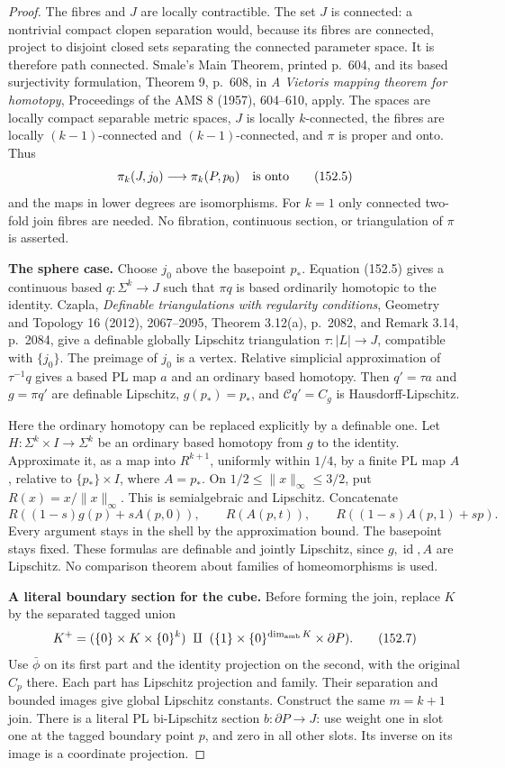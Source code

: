 \begin{proof}
The fibres and \(J\) are locally contractible.
The set \(J\) is connected: a nontrivial compact clopen separation
would, because its fibres are connected, project to disjoint closed
sets separating the connected parameter space. It is therefore path
connected. Smale's Main Theorem, printed p.~604, and its based
surjectivity formulation, Theorem 9, p.~608, in
\emph{A Vietoris mapping theorem for homotopy},
Proceedings of the AMS 8 (1957), 604--610, apply.
The spaces are locally compact separable metric spaces, \(J\) is
locally \(k\)-connected, the fibres are locally
\((k-1)\)-connected and \((k-1)\)-connected, and \(\pi\) is proper
and onto. Thus
\[
 \pi_k(J,j_0)\longrightarrow\pi_k(P,p_0)
 \quad\hbox{is onto}
 \tag{152.5}
\]
and the maps in lower degrees are isomorphisms.
For \(k=1\) only connected two-fold join fibres are needed.
No fibration, continuous section, or triangulation of \(\pi\) is
asserted.

\textbf{The sphere case.}
Choose \(j_0\) above the basepoint \(p_*\).
Equation (152.5) gives a continuous based
\(q:\Sigma^k\to J\) such that \(\pi q\) is based ordinarily
homotopic to the identity.
Czapla, \emph{Definable triangulations with regularity conditions},
Geometry and Topology 16 (2012), 2067--2095,
Theorem 3.12(a), p.~2082, and Remark 3.14, p.~2084, give a definable
globally Lipschitz triangulation \(\tau:|L|\to J\), compatible with
\(\{j_0\}\). The preimage of \(j_0\) is a vertex.
Relative simplicial approximation of \(\tau^{-1}q\) gives a based
PL map \(a\) and an ordinary based homotopy.
Then \(q'=\tau a\) and \(g=\pi q'\) are definable Lipschitz,
\(g(p_*)=p_*\), and \(\mathcal Cq'=C_g\) is Hausdorff-Lipschitz.

Here the ordinary homotopy can be replaced explicitly by a definable
one. Let \(H:\Sigma^k\times I\to\Sigma^k\) be an ordinary based
homotopy from \(g\) to the identity. Approximate it, as a map into
\(R^{k+1}\), uniformly within \(1/4\), by a finite PL map \(A\),
relative to \(\{p_*\}\times I\), where \(A=p_*\).
On \(1/2\le\|x\|_\infty\le3/2\), put \(R(x)=x/\|x\|_\infty\).
This is semialgebraic and Lipschitz. Concatenate
\[
 R((1-s)g(p)+sA(p,0)),\qquad
 R(A(p,t)),\qquad
 R((1-s)A(p,1)+sp).
 \tag{152.6}
\]
Every argument stays in the shell by the approximation bound.
The basepoint stays fixed. These formulas are definable and jointly
Lipschitz, since \(g,\operatorname{id},A\) are Lipschitz.
No comparison theorem about families of homeomorphisms is used.

\textbf{A literal boundary section for the cube.}
Before forming the join, replace \(K\) by the separated tagged union
\[
 K^+=(\{0\}\times K\times\{0\}^k)
 \ \amalg\
 (\{1\}\times\{0\}^{\dim_{\rm amb}K}\times\partial P).
 \tag{152.7}
\]
Use \(\bar\phi\) on its first part and the identity projection on
the second, with the original \(C_p\) there.
Each part has Lipschitz projection and family. Their separation
and bounded images give global Lipschitz constants.
Construct the same \(m=k+1\) join.
There is a literal PL bi-Lipschitz section
\(b:\partial P\to J\): use weight one in slot one at the tagged
boundary point \(p\), and zero in all other slots.
Its inverse on its image is a coordinate projection.


\end{proof}

